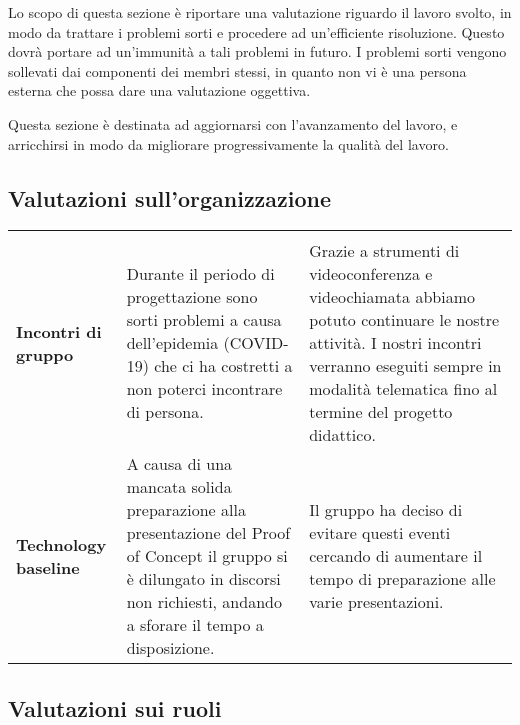 \documentclass[../piano-di-qualifica.tex]{subfiles}
\begin{document}
  Lo scopo di questa sezione è riportare una valutazione riguardo il lavoro svolto, in modo da trattare
  i problemi sorti e procedere ad un'efficiente risoluzione.
  Questo dovrà portare ad un'immunità a tali problemi in futuro.
  I problemi sorti vengono sollevati dai componenti dei membri stessi, in quanto non vi è una
  persona esterna che possa dare una valutazione oggettiva.

  Questa sezione è destinata ad aggiornarsi con l'avanzamento del lavoro, e arricchirsi in modo
  da migliorare progressivamente la qualità del lavoro.

  \subsection{Valutazioni sull'organizzazione}

  \begin{longtable}[H]{>{\centering\bfseries}m{4cm} >{\centering\arraybackslash}m{6cm} >{\centering\arraybackslash}m{6cm}}
    \rowcolor{darkgray!90!}
    \color{white}{\textbf{Dominio}} & \color{white}{\textbf{Problema}} & \color{white}{\textbf{Soluzione}} \\
    Incontri di gruppo & Durante il periodo di progettazione sono sorti problemi a causa dell'epidemia (COVID-19) che ci ha costretti a non poterci incontrare di persona.  & Grazie a strumenti di videoconferenza e videochiamata abbiamo potuto continuare le nostre attività. I nostri incontri verranno eseguiti sempre in modalità telematica fino al termine del progetto didattico.\\
    Technology baseline & A causa di una mancata solida preparazione alla presentazione del Proof of Concept il gruppo si è dilungato in discorsi non richiesti, andando a sforare il tempo a disposizione. & Il gruppo ha deciso di evitare questi eventi cercando di aumentare il tempo di preparazione alle varie presentazioni. \\
  \end{longtable}


\newpage
  \subsection{Valutazioni sui ruoli}
\end{document}
